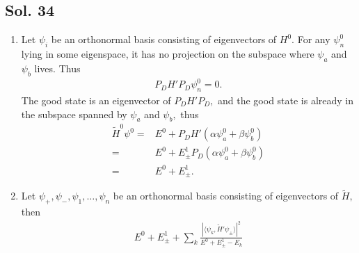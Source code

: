 \subsection*{Sol. 34}
\begin{enumerate}
    \item Let $\psi_i$ be an orthonormal basis consisting of eigenvectors of $H^0.$ For any $\psi_n^0$ lying in some eigenspace, it has no projection on the subspace where $\psi_a$ and $\psi_b$ lives. Thus
    \begin{align*}
        P_DH'P_D\psi_n^0 = 0.
    \end{align*}
    The good state is an eigenvector of $P_DH'P_D,$ and the good state is already in the subspace spanned by $\psi_a$ and $\psi_b,$ thus
    \begin{align*}
        \tilde H^0\psi^0 =& E^0 + P_DH'(\alpha\psi_a^0 + \beta\psi_b^0)\\
        =&E^0 + E^1_\pm P_D(\alpha\psi_a^0 + \beta\psi_b^0)\\
        =&E^0 + E^1_\pm.
    \end{align*}
    \item Let $\psi_+, \psi_-, \psi_1,\dots,\psi_n$ be an orthonormal basis consisting of eigenvectors of $\tilde H,$ then
    \begin{align*}
        E^0 + E^1_\pm + \sum_k
        \frac{|\langle\psi_k, \tilde H'\psi_\pm\rangle|^2}{E^0+E^1_\pm -E_k}
    \end{align*}
    
\end{enumerate}

